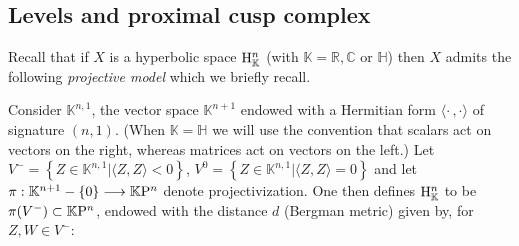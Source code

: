 \documentclass{article}[12pt]
\newcommand{\C}{\mathbb{C}}
\newcommand{\R}{\mathbb{R}}
\newcommand{\K}{\mathbb{K}}
\newcommand{\quat}{\mathbb{H}}
\newcommand{\oct}{\mathbb{O}}
\newtheorem{prop}{Proposition}%
\begin{document}




 

\subsection{Levels and proximal cusp complex}\label{levels}

Recall that if $X$ is a 
hyperbolic space ${\rm H}_\K^n$ (with $\K=\R, \C$ or $\quat$) 
then $X$ admits the following \emph{projective model} which we briefly recall.

Consider $\K^{n,1}$, the vector space $\K^{n+1}$ endowed with a Hermitian form $\langle \cdot \, , \cdot \rangle$ of signature $(n,1)$. (When $\K=\quat$ we will use the convention that scalars act on vectors on the right, whereas matrices act on vectors on the left.)
Let $V^-=\left\lbrace Z \in \K^{n,1} | \langle Z , Z \rangle <0 \right\rbrace$, $V^0=\left\lbrace Z \in \K^{n,1} | \langle Z , Z \rangle =0 \right\rbrace$ and let $\pi: \K^{n+1}-\{0\} \longrightarrow \K{\rm P}^n$ denote projectivization.
One then defines ${\rm H}_\K^n$ to be $\pi(V^-) \subset \K{\rm P}^n$, endowed with the distance $d$ (Bergman metric) given by, for $Z,W \in V^-$:
\end{document}
